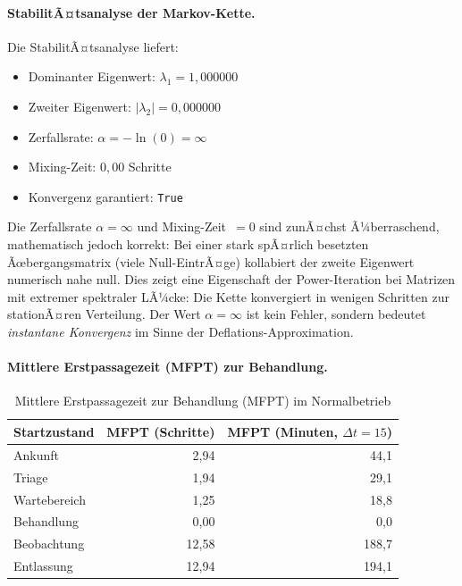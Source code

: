 ﻿\documentclass[a4paper,12pt]{scrreprt}
\theoremstyle{definition}
\begin{document}
\paragraph{StabilitÃ¤tsanalyse der Markov-Kette.}
Die StabilitÃ¤tsanalyse liefert:
\begin{itemize}
	\item[-] Dominanter Eigenwert: $\lambda_1 = 1{,}000000$
	\item[-] Zweiter Eigenwert: $|\lambda_2| = 0{,}000000$
	\item[-] Zerfallsrate: $\alpha = -\ln(0) = \infty$
	\item[-] Mixing-Zeit: $0{,}00$ Schritte
	\item[-] Konvergenz garantiert: \texttt{True}
\end{itemize}

Die Zerfallsrate $\alpha = \infty$ und Mixing-Zeit~$= 0$ sind zunÃ¤chst
Ã¼berraschend, mathematisch jedoch korrekt: Bei einer stark spÃ¤rlich besetzten
Ãœbergangsmatrix (viele Null-EintrÃ¤ge) kollabiert der zweite Eigenwert
numerisch nahe null. Dies zeigt eine Eigenschaft der Power-Iteration bei
Matrizen mit extremer spektraler LÃ¼cke: Die Kette konvergiert in wenigen
Schritten zur stationÃ¤ren Verteilung. Der Wert
$\alpha = \infty$ ist kein Fehler, sondern bedeutet \emph{instantane
	Konvergenz} im Sinne der Deflations-Approximation.

\paragraph{Mittlere Erstpassagezeit (MFPT) zur Behandlung.}
\begin{table}[H]
	\centering
	\begin{tabular}{@{}lrr@{}}
		\toprule
		\textbf{Startzustand} & \textbf{MFPT (Schritte)} & \textbf{MFPT (Minuten, $\Delta t=15$)} \\
		\midrule
		Ankunft     & 2{,}94 & 44{,}1 \\
		Triage      & 1{,}94 & 29{,}1 \\
		Wartebereich& 1{,}25 & 18{,}8 \\
		Behandlung  & 0{,}00 &  0{,}0 \\
		Beobachtung &12{,}58 &188{,}7 \\
		Entlassung  &12{,}94 &194{,}1 \\
		\bottomrule
	\end{tabular}
	\caption{Mittlere Erstpassagezeit zur Behandlung (MFPT) im Normalbetrieb}
	\label{tab:mfpt-normal}
\end{table}
\end{document}
